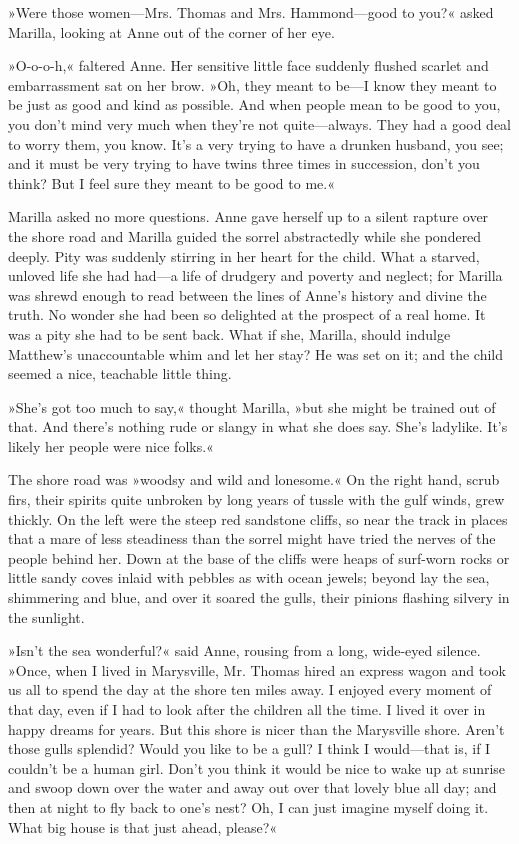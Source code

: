 »Were those women—Mrs. Thomas and Mrs. Hammond—good to you?« asked Marilla, looking at Anne out of the corner of her eye.

»O-o-o-h,« faltered Anne. Her sensitive little face suddenly flushed scarlet and embarrassment sat on her brow. »Oh, they meant to be—I know they meant to be just as good and kind as possible. And when people mean to be good to you, you don't mind very much when they're not quite—always. They had a good deal to worry them, you know. It's a very trying to have a drunken husband, you see; and it must be very trying to have twins three times in succession, don't you think? But I feel sure they meant to be good to me.«

Marilla asked no more questions. Anne gave herself up to a silent rapture over the shore road and Marilla guided the sorrel abstractedly while she pondered deeply. Pity was suddenly stirring in her heart for the child. What a starved, unloved life she had had—a life of drudgery and poverty and neglect; for Marilla was shrewd enough to read between the lines of Anne's history and divine the truth. No wonder she had been so delighted at the prospect of a real home. It was a pity she had to be sent back. What if she, Marilla, should indulge Matthew's unaccountable whim and let her stay? He was set on it; and the child seemed a nice, teachable little thing.

»She's got too much to say,« thought Marilla, »but she might be trained out of that. And there's nothing rude or slangy in what she does say. She's ladylike. It's likely her people were nice folks.«

The shore road was »woodsy and wild and lonesome.« On the right hand, scrub firs, their spirits quite unbroken by long years of tussle with the gulf winds, grew thickly. On the left were the steep red sandstone cliffs, so near the track in places that a mare of less steadiness than the sorrel might have tried the nerves of the people behind her. Down at the base of the cliffs were heaps of surf-worn rocks or little sandy coves inlaid with pebbles as with ocean jewels; beyond lay the sea, shimmering and blue, and over it soared the gulls, their pinions flashing silvery in the sunlight.

»Isn't the sea wonderful?« said Anne, rousing from a long, wide-eyed silence. »Once, when I lived in Marysville, Mr. Thomas hired an express wagon and took us all to spend the day at the shore ten miles away. I enjoyed every moment of that day, even if I had to look after the children all the time. I lived it over in happy dreams for years. But this shore is nicer than the Marysville shore. Aren't those gulls splendid? Would you like to be a gull? I think I would—that is, if I couldn't be a human girl. Don't you think it would be nice to wake up at sunrise and swoop down over the water and away out over that lovely blue all day; and then at night to fly back to one's nest? Oh, I can just imagine myself doing it. What big house is that just ahead, please?«

